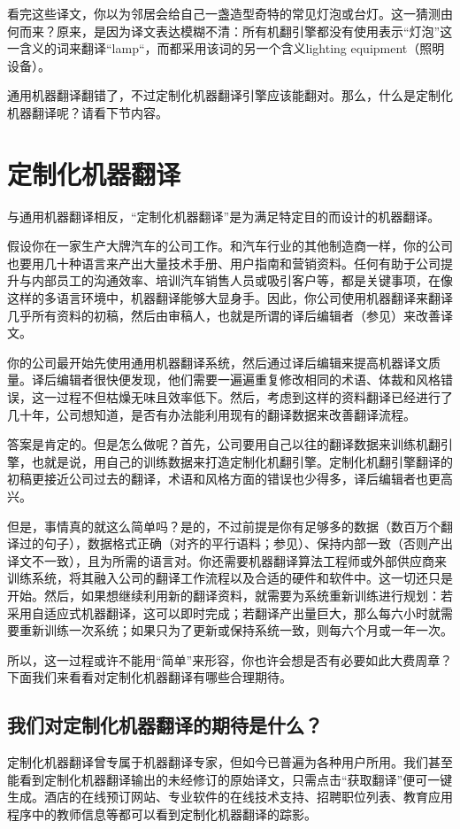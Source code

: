 \documentclass[output=paper]{langscibook}
\begin{document}
看完这些译文，你以为邻居会给自己一盏造型奇特的常见灯泡或台灯。这一猜测由何而来？原来，是因为译文表达模糊不清：所有机翻引擎都没有使用表示“灯泡”这一含义的词来翻译“lamp“，而都采用该词的另一个含义lighting equipment（照明设备）。

通用机器翻译翻错了，不过定制化机器翻译引擎应该能翻对。那么，什么是定制化机器翻译呢？请看下节内容。


\section{定制化机器翻译}

与通用机器翻译相反，“定制化机器翻译”是为满足特定目的而设计的机器翻译。

假设你在一家生产大牌汽车的公司工作。和汽车行业的其他制造商一样，你的公司也要用几十种语言来产出大量技术手册、用户指南和营销资料。任何有助于公司提升与内部员工的沟通效率、培训汽车销售人员或吸引客户等，都是关键事项，在像这样的多语言环境中，机器翻译能够大显身手。因此，你公司使用机器翻译来翻译几乎所有资料的初稿，然后由审稿人，也就是所谓的译后编辑者（参见）来改善译文。

你的公司最开始先使用通用机器翻译系统，然后通过译后编辑来提高机器译文质量。译后编辑者很快便发现，他们需要一遍遍重复修改相同的术语、体裁和风格错误，这一过程不但枯燥无味且效率低下。然后，考虑到这样的资料翻译已经进行了几十年，公司想知道，是否有办法能利用现有的翻译数据来改善翻译流程。

答案是肯定的。但是怎么做呢？首先，公司要用自己以往的翻译数据来训练机翻引擎，也就是说，用自己的训练数据来打造定制化机翻引擎。定制化机翻引擎翻译的初稿更接近公司过去的翻译，术语和风格方面的错误也少得多，译后编辑者也更高兴。

但是，事情真的就这么简单吗？是的，不过前提是你有足够多的数据（数百万个翻译过的句子），数据格式正确（对齐的平行语料；参见）、保持内部一致（否则产出译文不一致），且为所需的语言对。你还需要机器翻译算法工程师或外部供应商来训练系统，将其融入公司的翻译工作流程以及合适的硬件和软件中。这一切还只是开始。然后，如果想继续利用新的翻译资料，就需要为系统重新训练进行规划：若采用自适应式机器翻译，这可以即时完成；若翻译产出量巨大，那么每六小时就需要重新训练一次系统；如果只为了更新或保持系统一致，则每六个月或一年一次。

所以，这一过程或许不能用“简单”来形容，你也许会想是否有必要如此大费周章？下面我们来看看对定制化机器翻译有哪些合理期待。


\subsection{我们对定制化机器翻译的期待是什么？}
定制化机器翻译曾专属于机器翻译专家，但如今已普遍为各种用户所用。我们甚至能看到定制化机器翻译输出的未经修订的原始译文，只需点击“获取翻译”便可一键生成。酒店的在线预订网站、专业软件的在线技术支持、招聘职位列表、教育应用程序中的教师信息等都可以看到定制化机器翻译的踪影。
\end{document}
